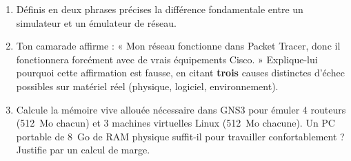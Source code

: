 \documentclass[11pt]{article}
\begin{document}
\begin{exercice}
\begin{enumerate}
    \item Définis en deux phrases précises la différence fondamentale entre un simulateur et un émulateur de réseau.
    \item Ton camarade affirme : « Mon réseau fonctionne dans Packet Tracer, donc il fonctionnera forcément avec de vrais équipements Cisco. » Explique-lui pourquoi cette affirmation est fausse, en citant \textbf{trois} causes distinctes d'échec possibles sur matériel réel (physique, logiciel, environnement).
    \item Calcule la mémoire vive allouée nécessaire dans GNS3 pour émuler 4 routeurs (\SI{512}{Mo} chacun) et 3 machines virtuelles Linux (\SI{512}{Mo} chacune). Un PC portable de \SI{8}{Go} de RAM physique suffit-il pour travailler confortablement ? Justifie par un calcul de marge.
\end{enumerate}
\end{exercice}
\end{document}
